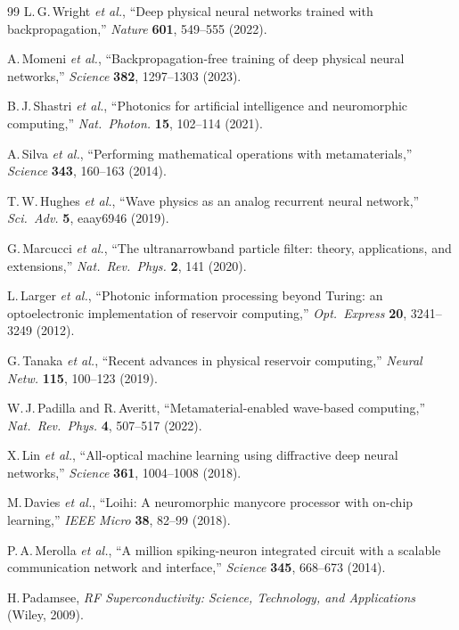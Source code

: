 \documentclass[12pt,a4paper,twoside]{article}
\begin{document}
\begin{thebibliography}{99}
L.\,G.\,Wright \emph{et al.}, ``Deep physical neural networks trained with backpropagation,'' \emph{Nature} \textbf{601}, 549--555 (2022).

A.\,Momeni \emph{et al.}, ``Backpropagation-free training of deep physical neural networks,'' \emph{Science} \textbf{382}, 1297--1303 (2023).

B.\,J.\,Shastri \emph{et al.}, ``Photonics for artificial intelligence and neuromorphic computing,'' \emph{Nat.\ Photon.} \textbf{15}, 102--114 (2021).

A.\,Silva \emph{et al.}, ``Performing mathematical operations with metamaterials,'' \emph{Science} \textbf{343}, 160--163 (2014).

T.\,W.\,Hughes \emph{et al.}, ``Wave physics as an analog recurrent neural network,'' \emph{Sci.\ Adv.} \textbf{5}, eaay6946 (2019).

G.\,Marcucci \emph{et al.}, ``The ultranarrowband particle filter: theory, applications, and extensions,'' \emph{Nat.\ Rev.\ Phys.} \textbf{2}, 141 (2020).

L.\,Larger \emph{et al.}, ``Photonic information processing beyond Turing: an optoelectronic implementation of reservoir computing,'' \emph{Opt.\ Express} \textbf{20}, 3241--3249 (2012).

G.\,Tanaka \emph{et al.}, ``Recent advances in physical reservoir computing,'' \emph{Neural Netw.} \textbf{115}, 100--123 (2019).

W.\,J.\,Padilla and R.\,Averitt, ``Metamaterial-enabled wave-based computing,'' \emph{Nat.\ Rev.\ Phys.} \textbf{4}, 507--517 (2022).

X.\,Lin \emph{et al.}, ``All-optical machine learning using diffractive deep neural networks,'' \emph{Science} \textbf{361}, 1004--1008 (2018).

M.\,Davies \emph{et al.}, ``Loihi: A neuromorphic manycore processor with on-chip learning,'' \emph{IEEE Micro} \textbf{38}, 82--99 (2018).

P.\,A.\,Merolla \emph{et al.}, ``A million spiking-neuron integrated circuit with a scalable communication network and interface,'' \emph{Science} \textbf{345}, 668--673 (2014).

H.\,Padamsee, \emph{RF Superconductivity: Science, Technology, and Applications} (Wiley, 2009).


\end{thebibliography}
\end{document}
